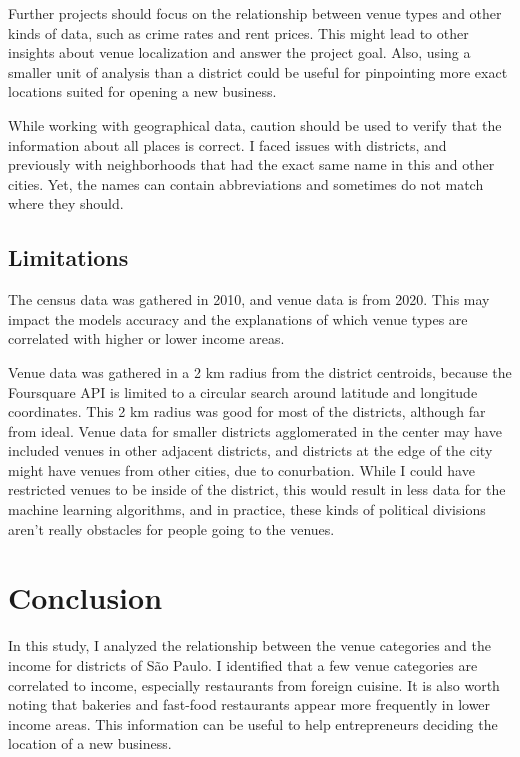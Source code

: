 \documentclass[12pt]{article}
\begin{document}
Further projects should focus on the relationship between venue types and other kinds of
data, such as crime rates and rent prices. This might
lead to other insights about venue localization and answer the project goal. Also, using a smaller unit of analysis than a district could be
useful for pinpointing more exact locations suited for opening a new business.

While working with geographical data, caution should be used to verify that the
information about all places is correct. I faced issues with districts, and
previously with neighborhoods that had the exact same name in this and other
cities. Yet, the names can contain abbreviations and sometimes do not match
where they should.

\subsection{Limitations}

The census data was gathered in 2010, and venue data is from 2020. This may
impact the models accuracy and the explanations of which venue types are
correlated with higher or lower income areas.

Venue data was gathered in a 2 km radius from the district centroids, because
the Foursquare API is limited to a circular search around latitude and
longitude coordinates. This 2 km radius was good for most of the districts, although far from ideal. Venue data for smaller districts agglomerated
in the center may have included venues in other adjacent districts, and
districts at the edge of the city might have venues from other cities, due to
conurbation. While I could have restricted venues to be inside of the district,
this would result in less data for the machine learning algorithms, and in
practice, these kinds of political divisions aren't really obstacles for people
going to the venues.

\section{Conclusion}

In this study, I analyzed the relationship between the venue categories and the
income for districts of São Paulo. I identified that a few venue
categories are correlated to income, especially restaurants from foreign
cuisine. It is also worth noting that bakeries and fast-food restaurants appear
more frequently in lower income areas. This information can be useful to help
entrepreneurs deciding the location of a new business.
\end{document}
